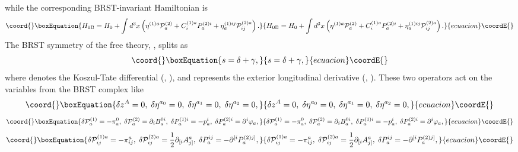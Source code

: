\documentclass[a4paper,12pt]{article}
\begin{document}
while the corresponding BRST-invariant Hamiltonian is 
\begin{equation}\coord{}\boxEquation{
H_{0\mathrm{B}}=H_{0}+\int d^{3}x\left( \eta ^{(1)a}\mathcal{P}
_{a}^{(2)}+C_{i}^{(1)a}P_{a}^{(2)i}+\eta _{a}^{(1)ij}\mathcal{P}
_{ij}^{(2)a}\right) .  \label{xx27}
}{
H_{0\mathrm{B}}=H_{0}+\int d^{3}x\left( \eta ^{(1)a}\mathcal{P}
_{a}^{(2)}+C_{i}^{(1)a}P_{a}^{(2)i}+\eta _{a}^{(1)ij}\mathcal{P}
_{ij}^{(2)a}\right) .  }{ecuacion}\coordE{}\end{equation}
The BRST symmetry of the free theory, \coordHE{},
splits as 
\begin{equation}\coord{}\boxEquation{
s=\delta +\gamma ,  \label{xx28}
}{
s=\delta +\gamma ,  }{ecuacion}\coordE{}\end{equation}
where \myHighlight{$\delta $}\coordHE{} denotes the Koszul-Tate differential (\coordHE{}, \coordHE{}), and \myHighlight{$\gamma $}\coordHE{}
represents the exterior longitudinal derivative (\coordHE{}, \coordHE{}). These two
operators act on the variables from the BRST complex like 
\begin{equation}\coord{}\boxEquation{
\delta z^{A}=0,\;\delta \eta ^{a_{0}}=0,\;\delta \eta ^{a_{1}}=0,\;\delta
\eta ^{a_{2}}=0,  \label{xx29}
}{
\delta z^{A}=0,\;\delta \eta ^{a_{0}}=0,\;\delta \eta ^{a_{1}}=0,\;\delta
\eta ^{a_{2}}=0,  }{ecuacion}\coordE{}\end{equation}
\begin{equation}\coord{}\boxEquation{
\delta \mathcal{P}_{a}^{(1)}=-\pi _{a}^{0},\;\delta \mathcal{P}
_{a}^{(2)}=\partial _{i}B_{a}^{0i},\;\delta P_{a}^{(1)i}=-p_{a}^{i},\;\delta
P_{a}^{(2)i}=\partial ^{i}\varphi _{a},  \label{xx30}
}{
\delta \mathcal{P}_{a}^{(1)}=-\pi _{a}^{0},\;\delta \mathcal{P}
_{a}^{(2)}=\partial _{i}B_{a}^{0i},\;\delta P_{a}^{(1)i}=-p_{a}^{i},\;\delta
P_{a}^{(2)i}=\partial ^{i}\varphi _{a},  }{ecuacion}\coordE{}\end{equation}
\begin{equation}\coord{}\boxEquation{
\delta \mathcal{P}_{ij}^{(1)a}=-\pi _{ij}^{a},\;\delta \mathcal{P}
_{ij}^{(2)a}=\frac{1}{2}\partial _{[i}A_{j]}^{a},\;\delta
P_{a}^{ij}=-\partial ^{[i}P_{a}^{(2)j]},  \label{xx31}
}{
\delta \mathcal{P}_{ij}^{(1)a}=-\pi _{ij}^{a},\;\delta \mathcal{P}
_{ij}^{(2)a}=\frac{1}{2}\partial _{[i}A_{j]}^{a},\;\delta
P_{a}^{ij}=-\partial ^{[i}P_{a}^{(2)j]},  }{ecuacion}\coordE{}\end{equation}
\end{document}
